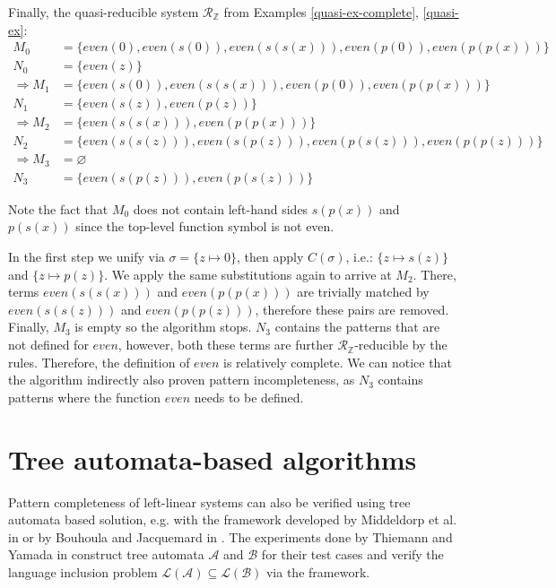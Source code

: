 \begin{example} \label{quasi-ex-alg} Finally, the quasi-reducible system $\mathcal{R}_\mathbb{Z}$ from Examples \ref{quasi-ex-complete}, \ref{quasi-ex}:
\begin{align*}
    M_0 &= \{even(0), even(s(0)), even(s(s(x))), even(p(0)), even(p(p(x)))\} \\
    N_0 &= \{even(z)\} \\
    \Rightarrow M_1 &= \{even(s(0)), even(s(s(x))), even(p(0)), even(p(p(x)))\} \\
    N_1 &= \{even(s(z)), even(p(z))\} \\
    \Rightarrow M_2 &= \{even(s(s(x))), even(p(p(x)))\} \\
    N_2 &= \{even(s(s(z))), even(s(p(z))), even(p(s(z))), even(p(p(z)))\} \\
    \Rightarrow M_3 &= \varnothing \\
    N_3 &= \{even(s(p(z))), even(p(s(z)))\}
\end{align*}

Note the fact that $M_0$ does not contain left-hand sides $s(p(x))$ and $p(s(x))$ since the top-level function symbol is not even.

In the first step we unify via $\sigma = \{z \mapsto 0\}$, then apply $C(\sigma)$, i.e.: $\{z \mapsto s(z)\}$ and $\{z \mapsto p(z)\}$. We apply the same substitutions again to arrive at $M_2$. There, terms $even(s(s(x)))$ and $even(p(p(x)))$ are trivially matched by $even(s(s(z)))$ and $even(p(p(z)))$, therefore these pairs are removed. Finally, $M_3$ is empty so the algorithm stops. $N_3$ contains the patterns that are not defined for $even$, however, both these terms are further $\mathcal{R}_\mathbb{Z}$-reducible by the rules. Therefore, the definition of $even$ is relatively complete. We can notice that the algorithm indirectly also proven pattern incompleteness, as $N_3$ contains patterns where the function $even$ needs to be defined.

\end{example}

\section{Tree automata-based algorithms}
Pattern completeness of left-linear systems can also be verified using tree automata based solution, e.g. with the framework developed by Middeldorp et al. in \cite{middeldorp} or by Bouhoula and Jacquemard in \cite{bouhoula}. The experiments done by Thiemann and Yamada in \cite{thiemann} construct tree automata $\mathcal{A}$ and $\mathcal{B}$ for their test cases and verify the language inclusion problem $\mathcal{L}(\mathcal{A}) \subseteq \mathcal{L}(\mathcal{B})$ via the framework. 

